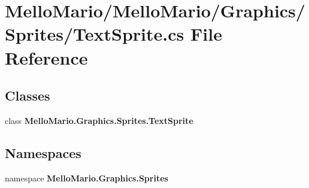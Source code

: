 \section{Mello\+Mario/\+Mello\+Mario/\+Graphics/\+Sprites/\+Text\+Sprite.cs File Reference}
\label{TextSprite_8cs}
\subsection*{Classes}
\begin{DoxyCompactItemize}
\item 
class \textbf{ Mello\+Mario.\+Graphics.\+Sprites.\+Text\+Sprite}
\end{DoxyCompactItemize}
\subsection*{Namespaces}
\begin{DoxyCompactItemize}
\item 
namespace \textbf{ Mello\+Mario.\+Graphics.\+Sprites}
\end{DoxyCompactItemize}
